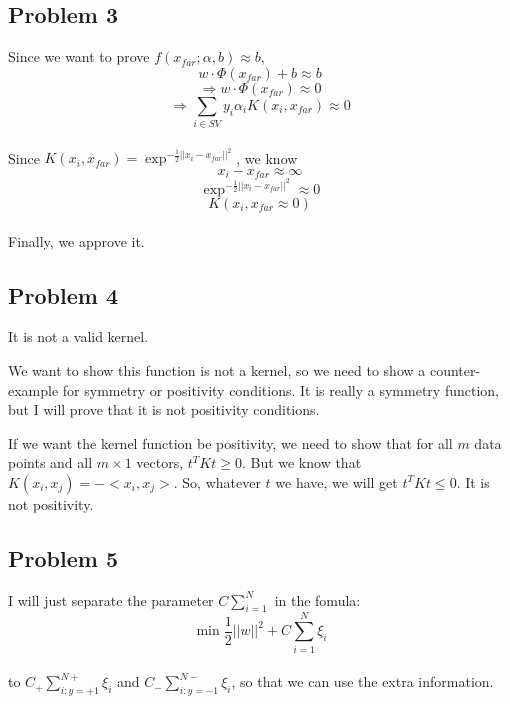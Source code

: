 \documentclass[12pt]{article}
\begin{document}
        \subsection{Problem 3}
            \par Since we want to prove $f(x_{far};\alpha,b)\approx b$,
            \[w\cdot\Phi(x_{far})+b\approx b\]
            \[\Rightarrow w\cdot\Phi(x_{far})\approx 0\]
            \[\Rightarrow\sum_{i\in SV}y_i\alpha_iK(x_i,x_{far})\approx 0\]
            \\ Since $K(x_i,x_{far})=\exp^{-\frac{1}{2}||x_i-x_{far}||^2}$, we know
            \[x_i-x_{far}\approx\infty\]
            \[\exp^{-\frac{1}{2}||x_i-x_{far}||^2}\approx 0\]
            \[K(x_i,x_{far}\approx 0)\]
            \\ Finally, we approve it.
        \subsection{Problem 4}
            \par It is not a valid kernel.
            \par We want to show this function is not a kernel, so we need to show a
            counter-example for symmetry or positivity conditions. It is really a symmetry
            function, but I will prove that it is not positivity conditions.
            \par If we want the kernel function be positivity, we need to show that for all $m$
            data points and all $m\times 1$ vectors, $t^TKt\ge 0$. But we know that $K(x_i,x_j)=-<x_i,x_j>$.
            So, whatever $t$ we have, we will get $t^TKt\le 0$. It is not positivity.
        \subsection{Problem 5}
            \par I will just separate the parameter $C\sum_{i=1}^{N}$ in the fomula:
            \[\min\frac{1}{2}||w||^2+C\sum_{i=1}^{N}\xi_i\]
            \\ to $C_+\sum_{i:y=+1}^{N+}\xi_i$ and $C_-\sum_{i:y=-1}^{N-}\xi_i$, so that we can use the extra information.
\end{document}
